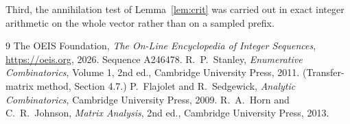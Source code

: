 \documentclass[11pt,a4paper]{article}
\theoremstyle{plain}
\theoremstyle{definition}
\begin{document}
Third, the annihilation test of Lemma~\ref{lem:crit} was carried out in exact integer
arithmetic on the whole vector rather than on a sampled prefix.

\begin{thebibliography}{9}
 The OEIS Foundation, \emph{The On-Line Encyclopedia of Integer
Sequences}, \url{https://oeis.org}, 2026. Sequence A246478.
 R.~P.~Stanley, \emph{Enumerative Combinatorics}, Volume 1, 2nd ed.,
Cambridge University Press, 2011. (Transfer-matrix method, Section 4.7.)
 P.~Flajolet and R.~Sedgewick, \emph{Analytic Combinatorics}, Cambridge
University Press, 2009.
 R.~A.~Horn and C.~R.~Johnson, \emph{Matrix Analysis}, 2nd ed., Cambridge
University Press, 2013.
\end{thebibliography}
\end{document}
